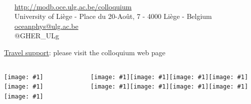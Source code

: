 \documentclass[final,table,14pt,aspectratio=141]{beamer}
\newcommand{\seplogo}{\hspace{.35cm}}
\newcommand{\putlogo}[1]{\texttt{[image: \#1]}}
\newcommand{\putlogoB}[1]{\texttt{[image: \#1]}}
\begin{document}
\begin{frame}[fragile]
\begin{columns}[totalwidth=1.\textwidth,c]
\end{columns}


\vspace{-0.02\textheight}
{ \rmfamily \tiny
\textcolor{greygher}{\faCalendarCheckO~~~\insertdate}\\
\textcolor{bluegher}{{\ComputerMouse}~~~\url{http://modb.oce.ulg.ac.be/colloquium}}\\
\textcolor{greygher}{\faHome~~~University of Liège - Place du 20-Août, 7 - 4000 Liège - Belgium}\\ 
\textcolor{bluegher}{\Letter}~~~\href{mailto:oceanphys@ulg.ac.be}{oceanphys@ulg.ac.be}\\
\textcolor{greygher}{\faTwitter~~~@GHER\_ULg}\\
}

\vspace{.05cm}
{\scriptsize 
{}
}

{\scriptsize 
\href{http://modb.oce.ulg.ac.be/colloquium/2016/#col_travel_grants}{Travel support}: please visit the colloquium web page
}

\vfill

\begin{columns}[totalwidth=1.\textwidth,c]

\scriptsize


\putlogo{logo_gher}\seplogo\putlogo{logo_imedea}\seplogo\putlogo{logo_whoi} %

~

\scriptsize
\putlogo{coq_wallon}\seplogo\putlogo{logo_IOC}\seplogo\putlogo{logoSocib}\seplogo\putlogo{logo_CNES}\seplogo\putlogo{logo_esa}\seplogo \putlogo{logo_nasa}\seplogo\putlogo{logo_onr}\seplogo\putlogo{logo_iugg}%

\end{columns}

\end{frame}
\end{document}
